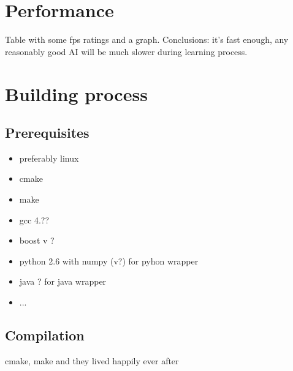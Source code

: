 \section{Performance}
Table with some fps ratings and a graph.
Conclusions: it's fast enough, any reasonably good AI will be much slower during learning process.

\section{Building process}
\subsection{Prerequisites}
\begin{itemize}
\item preferably linux
\item cmake
\item make
\item gcc 4.??
\item boost v ?
\item python 2.6 with numpy (v?) for pyhon wrapper
\item java ? for java wrapper
\item ...
\end{itemize}
\subsection{Compilation}
cmake, make and they lived happily ever after

